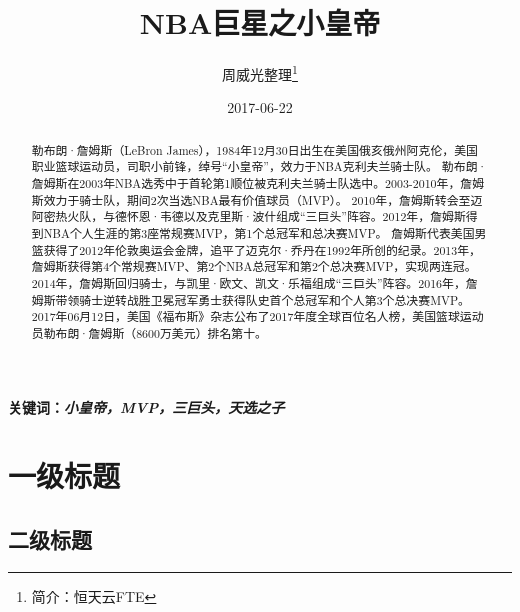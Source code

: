 \documentclass[a4paper,left=1.5cm,right=1.5cm,11pt]{article}
\title{NBA巨星之小皇帝}
\author{周威光整理\footnote{简介：恒天云FTE}}
\date{2017-06-22}
\begin{document}
\maketitle
\clearpage
\tableofcontents
\clearpage
\begin{abstract}
勒布朗·詹姆斯（LeBron James），1984年12月30日出生在美国俄亥俄州阿克伦，美国职业篮球运动员，司职小前锋，绰号“小皇帝”，效力于NBA克利夫兰骑士队。
勒布朗·詹姆斯在2003年NBA选秀中于首轮第1顺位被克利夫兰骑士队选中。2003-2010年，詹姆斯效力于骑士队，期间2次当选NBA最有价值球员（MVP）。
2010年，詹姆斯转会至迈阿密热火队，与德怀恩·韦德以及克里斯·波什组成“三巨头”阵容。2012年，詹姆斯得到NBA个人生涯的第3座常规赛MVP，第1个总冠军和总决赛MVP。
詹姆斯代表美国男篮获得了2012年伦敦奥运会金牌，追平了迈克尔·乔丹在1992年所创的纪录。2013年，詹姆斯获得第4个常规赛MVP、第2个NBA总冠军和第2个总决赛MVP，实现两连冠。
2014年，詹姆斯回归骑士，与凯里·欧文、凯文·乐福组成“三巨头”阵容。2016年，詹姆斯带领骑士逆转战胜卫冕冠军勇士获得队史首个总冠军和个人第3个总决赛MVP。
2017年06月12日，美国《福布斯》杂志公布了2017年度全球百位名人榜，美国篮球运动员勒布朗·詹姆斯（8600万美元）排名第十。
\end{abstract}
\bf{关键词：}\it{小皇帝}，\it{MVP}，\it{三巨头}，\it{天选之子} 
\clearpage
 
\section{一级标题}
\subsection{二级标题}
\end{document}
